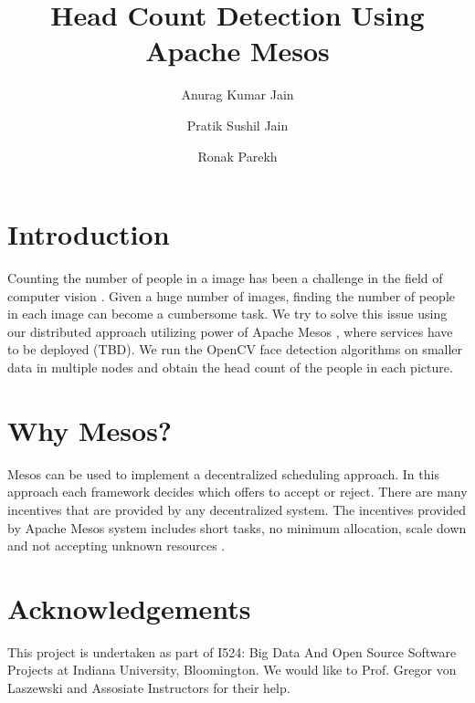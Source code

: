 \documentclass[9pt,twocolumn,twoside]{../../styles/osajnl}
\title{Head Count Detection Using Apache Mesos}
\author[1]{Anurag Kumar Jain}
\author[1]{Pratik Sushil Jain}
\author[1]{Ronak Parekh}
\affil[1]{School of Informatics and Computing, Bloomington, IN 47408, U.S.A.}
\begin{document}
\maketitle

\section{Introduction}

Counting the number of people in a image has been a challenge in the
field of computer vision \cite{www-face-detection-wikipedia}. Given a
huge number of images, finding the number of people in each image can
become a cumbersome task. We try to solve this issue using our
distributed approach utilizing power of Apache Mesos \cite{www-mesos}
, where services have to be deployed (TBD). We run the OpenCV
\cite{www-opencv-wikipedia} face detection algorithms on smaller data
in multiple nodes and obtain the head count of the people in each
picture.

\section{Why Mesos?}
Mesos can be used to implement a decentralized scheduling approach. In
this approach each framework decides which offers to accept or
reject. There are many incentives that are provided by any
decentralized system. The incentives provided by Apache Mesos system
includes short tasks, no minimum allocation, scale down and not
accepting unknown resources \cite{www-mesos-paper}.

\section*{Acknowledgements}

This project is undertaken as part of I524: Big Data And Open Source
Software Projects at Indiana University, Bloomington. We would like to
Prof. Gregor von Laszewski and Assosiate Instructors for their help.



\end{document}
